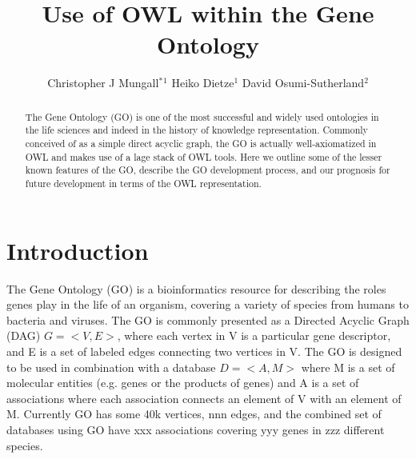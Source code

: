 \documentclass{llncs}
\makeatletter
\def\correspondingauthor{$^*$}
\def\address#1{ \def\@address{\begin{hi}\footnotesize#1\end{hi}}}
\def\iid(#1){\hi$^#1$}
\makeatother
\begin{document}
%
\frontmatter          %

\title{Use of OWL within the Gene Ontology}
\author{
Christopher J Mungall\correspondingauthor$^{1}$
Heiko Dietze$^{1}$
David Osumi-Sutherland$^{2}$
}

\address{%
    \iid(1)Lawrence Berkeley National Laboratory, CA 94720\\
    \iid(2)European Bioinformatics Institute\\
}

\institute{}

\maketitle              %

\begin{abstract}

The Gene Ontology (GO) is one of the most successful and widely used
ontologies in the life sciences and indeed in the history of knowledge
representation. Commonly conceived of as a simple direct acyclic
graph, the GO is actually well-axiomatized in OWL and makes use of a
lage stack of OWL tools. Here we outline some of the lesser known
features of the GO, describe the GO development process, and our
prognosis for future development in terms of the OWL representation.


\end{abstract}

\section{Introduction}

The Gene Ontology (GO) is a bioinformatics resource for describing the
roles genes play in the life of an organism, covering a variety of
species from humans to bacteria and viruses. The GO is commonly
presented as a Directed Acyclic Graph (DAG) $G = <V,E>$, where each
vertex in V is a particular gene descriptor, and E is a set of labeled
edges connecting two vertices in V. The GO is designed to be used in
combination with a database $D = <A, M>$ where M is a set of molecular
entities (e.g. genes or the products of genes) and A is a set of
associations where each association connects an element of V with an
element of M. Currently GO has some 40k vertices, nnn edges, and the
combined set of databases using GO have xxx associations covering yyy
genes in zzz different species\cite{Blake2013}.
\end{document}
